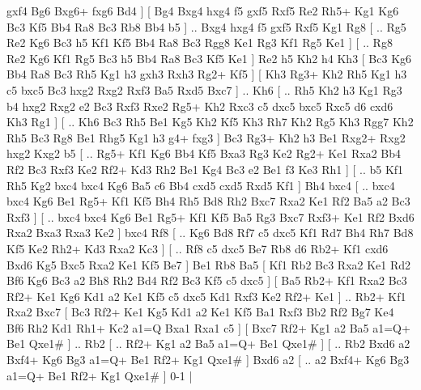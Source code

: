 gxf4 Bg6  Bxg6+ fxg6  Bd4   ]  [  Bg4 Bxg4  hxg4 f5  gxf5 Rxf5  Re2 Rh5+  Kg1 Kg6  Bc3 Kf5  Bb4 Ra8  Bc3 Rb8  Bb4 b5   ] .. Bxg4    hxg4   f5    gxf5   Rxf5    Kg1   Rg8 [ .. Rg5  Re2 Kg6  Bc3 h5  Kf1 Kf5  Bb4 Ra8  Bc3 Rgg8  Ke1 Rg3  Kf1 Rg5  Ke1   ]  [ .. Rg8  Re2 Kg6  Kf1 Rg5  Bc3 h5  Bb4 Ra8  Bc3 Kf5  Ke1   ]  Re2   h5    Kh2   h4    Kh3 [  Bc3 Kg6  Bb4 Ra8  Bc3 Rh5  Kg1 h3  gxh3 Rxh3  Rg2+ Kf5   ]  [  Kh3 Rg3+  Kh2 Rh5  Kg1 h3  c5 bxc5  Bc3 hxg2  Rxg2 Rxf3  Ba5 Rxd5  Bxc7   ] .. Kh6 [ .. Rh5  Kh2 h3  Kg1 Rg3  b4 hxg2  Rxg2 e2  Bc3 Rxf3  Rxe2 Rg5+  Kh2 Rxc3  c5 dxc5  bxc5 Rxc5  d6 cxd6  Kh3 Rg1   ]  [ .. Kh6  Bc3 Rh5  Be1 Kg5  Kh2 Kf5  Kh3 Rh7  Kh2 Rg5  Kh3 Rgg7  Kh2 Rh5  Bc3 Rg8  Be1 Rhg5  Kg1 h3  g4+ fxg3   ]  Bc3   Rg3+    Kh2   h3    Be1   Rxg2+    Rxg2   hxg2    Kxg2   b5 [ .. Rg5+  Kf1 Kg6  Bb4 Kf5  Bxa3 Rg3  Ke2 Rg2+  Ke1 Rxa2  Bb4 Rf2  Bc3 Rxf3  Ke2 Rf2+  Kd3 Rh2  Be1 Kg4  Bc3 e2  Be1 f3  Ke3 Rh1   ]  [ .. b5  Kf1 Rh5  Kg2 bxc4  bxc4 Kg6  Ba5 c6  Bb4 cxd5  cxd5 Rxd5  Kf1   ]  Bh4   bxc4 [ .. bxc4  bxc4 Kg6  Be1 Rg5+  Kf1 Kf5  Bh4 Rh5  Bd8 Rh2  Bxc7 Rxa2  Ke1 Rf2  Ba5 a2  Bc3 Rxf3   ]  [ .. bxc4  bxc4 Kg6  Be1 Rg5+  Kf1 Kf5  Ba5 Rg3  Bxc7 Rxf3+  Ke1 Rf2  Bxd6 Rxa2  Bxa3 Rxa3  Ke2   ]  bxc4   Rf8 [ .. Kg6  Bd8 Rf7  c5 dxc5  Kf1 Rd7  Bh4 Rh7  Bd8 Kf5  Ke2 Rh2+  Kd3 Rxa2  Kc3   ]  [ .. Rf8  c5 dxc5  Be7 Rb8  d6 Rb2+  Kf1 cxd6  Bxd6 Kg5  Bxc5 Rxa2  Ke1 Kf5  Be7   ]  Be1   Rb8    Ba5 [  Kf1 Rb2  Bc3 Rxa2  Ke1 Rd2  Bf6 Kg6  Bc3 a2  Bh8 Rh2  Bd4 Rf2  Bc3 Kf5  c5 dxc5   ]  [  Ba5 Rb2+  Kf1 Rxa2  Bc3 Rf2+  Ke1 Kg6  Kd1 a2  Ke1 Kf5  c5 dxc5  Kd1 Rxf3  Ke2 Rf2+  Ke1   ] .. Rb2+    Kf1   Rxa2    Bxc7 [  Bc3 Rf2+  Ke1 Kg5  Kd1 a2  Ke1 Kf5  Ba1 Rxf3  Bb2 Rf2  Bg7 Ke4  Bf6 Rh2  Kd1 Rh1+  Kc2 a1=Q  Bxa1 Rxa1  c5   ]  [  Bxc7 Rf2+  Kg1 a2  Ba5 a1=Q+  Be1 Qxe1#   ] .. Rb2 [ .. Rf2+  Kg1 a2  Ba5 a1=Q+  Be1 Qxe1#   ]  [ .. Rb2  Bxd6 a2  Bxf4+ Kg6  Bg3 a1=Q+  Be1 Rf2+  Kg1 Qxe1#   ]  Bxd6   a2    [ .. a2  Bxf4+ Kg6  Bg3 a1=Q+  Be1 Rf2+  Kg1 Qxe1#   ] 0-1  |

